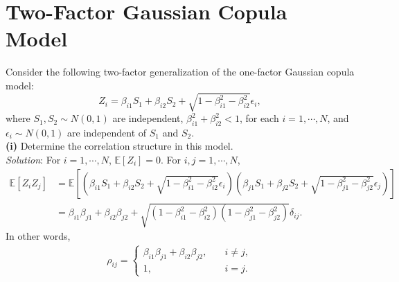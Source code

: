 \documentclass[paper=a4, fontsize=11pt]{scrartcl} %
\numberwithin{equation}{section} %
\numberwithin{figure}{section} %
\numberwithin{table}{section} %
\begin{document}
\newpage
\section{Two-Factor Gaussian Copula Model}
Consider the following two-factor generalization of the one-factor Gaussian copula model:
$$
Z_i = \beta_{i1}S_1 + \beta_{i2}S_2 + \sqrt{1 - \beta_{i1}^2 - \beta_{i2}^2}\epsilon_i,
$$
where $S_1,S_2\sim N(0,1)$ are independent, $\beta_{i1}^2 + \beta_{i2}^2 < 1$, for each
$i=1,\cdots,N$, and $\epsilon_i \sim N(0,1)$ are independent of $S_1$ and $S_2$.\\

\textbf{(i)} Determine the correlation structure in this model.\\
\textit{Solution}: For $i=1,\cdots,N$, $\mathbb{E}[Z_i] = 0$. For $i,j=1,\cdots,N$,
\begin{align*}
\mathbb{E}\left[Z_i Z_j\right] &= \mathbb{E}\left[ \left(\beta_{i1}S_1 + \beta_{i2}S_2 + \sqrt{1 - \beta_{i1}^2 - \beta_{i2}^2}\epsilon_i\right)
\left(\beta_{j1}S_1 + \beta_{j2}S_2 + \sqrt{1 - \beta_{j1}^2 - \beta_{j2}^2}\epsilon_j\right) \right]\\
&= \beta_{i1}\beta_{j1}+ \beta_{i2}\beta_{j2} + \sqrt{\left( 1 - \beta_{i1}^2 - \beta_{i2}^2 \right)\left( 1 - \beta_{j1}^2 - \beta_{j2}^2 \right)}\delta_{ij}.
\end{align*}
In other words,
\begin{align*}
\rho_{ij} = \begin{cases}
\beta_{i1}\beta_{j1}+ \beta_{i2}\beta_{j2}, \quad & i\neq j,\\
1, \quad &i=j.
\end{cases}
\end{align*}
\end{document}
